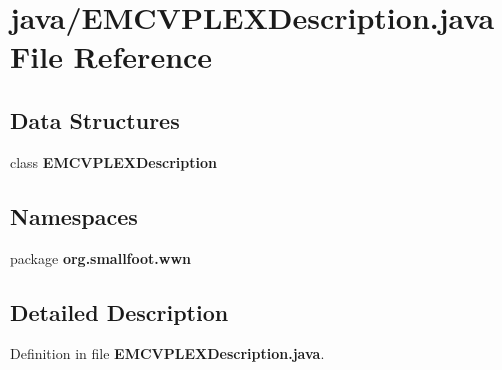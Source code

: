 \section{java/\-E\-M\-C\-V\-P\-L\-E\-X\-Description.java \-File \-Reference}
\label{EMCVPLEXDescription_8java}
\subsection*{\-Data \-Structures}
\begin{DoxyCompactItemize}
\item 
class {\bf \-E\-M\-C\-V\-P\-L\-E\-X\-Description}
\end{DoxyCompactItemize}
\subsection*{\-Namespaces}
\begin{DoxyCompactItemize}
\item 
package {\bf org.\-smallfoot.\-wwn}
\end{DoxyCompactItemize}


\subsection{\-Detailed \-Description}


\-Definition in file {\bf \-E\-M\-C\-V\-P\-L\-E\-X\-Description.\-java}.

